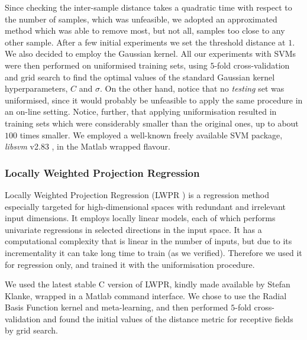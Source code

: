Since checking the inter-sample distance takes a quadratic time with
respect to the number of samples, which was unfeasible, we adopted an
approximated method which was able to remove most, but not all,
samples too close to any other sample. After a few initial experiments
we set the threshold distance at $1$. We also decided to employ the
Gaussian kernel. All our experiments with SVMs were then performed on
uniformised training sets, using $5$-fold cross-validation and grid
search to find the optimal values of the standard Gaussian kernel
hyperparameters, $C$ and $\sigma$. On the other hand, notice that no
\emph{testing} set was uniformised, since it would probably be
unfeasible to apply the same procedure in an on-line setting. Notice,
further, that applying uniformisation resulted in training sets which
were considerably smaller than the original ones, up to about $100$
times smaller. We employed a well-known freely available SVM package,
\emph{libsvm} v2.83 \cite{ChangL01}, in the Matlab wrapped flavour.

\subsubsection{Locally Weighted Projection Regression}

Locally Weighted Projection Regression (LWPR \cite{lwpr}) is a
regression method especially targeted for high-dimensional spaces with
redundant and irrelevant input dimensions. It employs locally linear
models, each of which performs univariate regressions in selected
directions in the input space. It has a computational complexity that
is linear in the number of inputs, but due to its incrementality it
can take long time to train (as we verified). Therefore we used it for
regression only, and trained it with the uniformisation procedure.

We used the latest stable C version of LWPR, kindly made available by
Stefan Klanke, wrapped in a Matlab command interface. We chose to use
the Radial Basis Function kernel and meta-learning, and then performed
$5$-fold cross-validation and found the initial values of the distance
metric for receptive fields by grid search.
